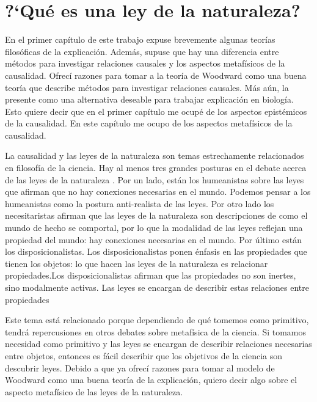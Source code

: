 
\chapter{?`Qué es una ley de la naturaleza?}

\noindent En el primer capítulo de este trabajo expuse brevemente algunas teorías filosóficas de la explicación. Además, supuse que hay una diferencia entre métodos para investigar relaciones causales y los aspectos metafísicos de la causalidad. Ofrecí razones para tomar a la teoría de Woodward como una buena teoría que describe métodos para investigar relaciones causales. Más aún, la presente como una alternativa deseable para trabajar explicación en biología. Esto quiere decir que en el primer capítulo me ocupé de los aspectos epistémicos de la causalidad. En este capítulo me ocupo de los aspectos metafísicos de la causalidad.

La causalidad y las leyes de la naturaleza son temas estrechamente relacionados en filosofía de la ciencia. Hay al menos tres grandes posturas en el debate acerca de las leyes de la naturaleza \cite{Borge2019}. Por un lado, están los humeanistas sobre las leyes que afirman que no hay conexiones necesarias en el mundo. Podemos pensar a los humeanistas como la postura anti-realista de las leyes. Por otro lado los necesitaristas afirman que las leyes de la naturaleza son descripciones de como el mundo de hecho se comportal, por lo que la modalidad de las leyes reflejan una propiedad del mundo: hay conexiones necesarias en el mundo. Por último están los disposicionalistas. Los disposicionalistas ponen énfasis en las propiedades que tienen los objetos: lo que hacen las leyes de la naturaleza es relacionar propiedades.Los disposicionalistas afirman que las propiedades no son inertes, sino modalmente activas. Las leyes se encargan de describir estas relaciones entre propiedades

Este tema está relacionado porque dependiendo de qué tomemos como primitivo, tendrá repercusiones en otros debates sobre metafísica de la ciencia. Si tomamos necesidad como primitivo y las leyes se encargan de describir relaciones necesarias entre objetos, entonces es fácil describir que los objetivos de la ciencia son descubrir leyes. Debido a que ya ofrecí razones para tomar al modelo de Woodward como una buena teoría de la explicación, quiero decir algo sobre el aspecto metafísico de las leyes de la naturaleza.


